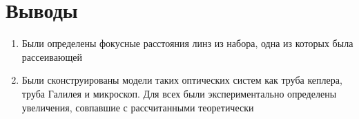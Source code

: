 \documentclass[a4paper, 12pt]{article}
\begin{document}
\section{Выводы}
\begin{enumerate}
    \item Были определены фокусные расстояния линз из набора, одна из которых была рассеивающей
    \item Были сконструированы модели таких оптических систем как труба кеплера, труба Галилея и микроскоп. Для всех были экспериментально определены увеличения, совпавшие с рассчитанными теоретически

\end{enumerate}
\end{document}
